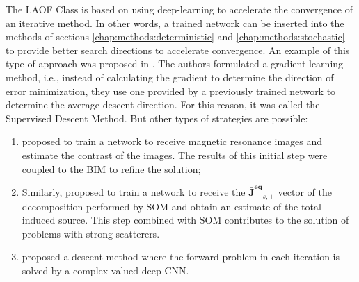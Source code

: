 		The LAOF Class is based on using deep-learning to accelerate the convergence of an iterative method. In other words, a trained network can be inserted into the methods of sections \ref{chap:methods:deterministic} and \ref{chap:methods:stochastic} to provide better search directions to accelerate convergence. An example of this type of approach was proposed in \citep{guo2019supervised}. The authors formulated a gradient learning method, i.e., instead of calculating the gradient to determine the direction of error minimization, they use one provided by a previously trained network to determine the average descent direction. For this reason, it was called the Supervised Descent Method. But other types of strategies are possible:
		\begin{enumerate}
			\item \cite{chen2020learning} proposed to train a network to receive magnetic resonance images and estimate the contrast of the images. The results of this initial step were coupled to the BIM to refine the solution;
			\item Similarly, \cite{sanghvi2020embedding} proposed to train a network to receive the $\mathbf{\bar{J}^{eq}}_{s,+}$ vector of the decomposition performed by SOM and obtain an estimate of the total induced source. This step combined with SOM contributes to the solution of problems with strong scatterers.
			\item \cite{yao2022enhanced} proposed a descent method where the forward problem in each iteration is solved by a complex-valued deep CNN.
		\end{enumerate}
			

